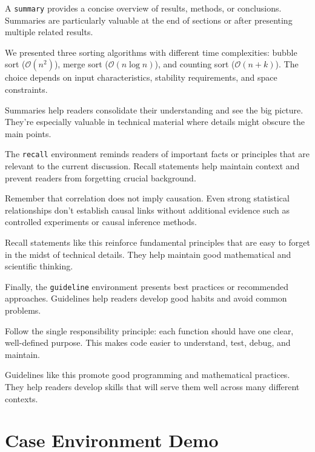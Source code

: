 \documentclass[9pt]{amsart}
\begin{document}
A \texttt{summary} provides a concise overview of results, methods, or
conclusions. Summaries are particularly valuable at the end of sections or
after presenting multiple related results.

\begin{summary}
	We presented three sorting algorithms with different time complexities: bubble sort ($\mathcal{O}(n^2)$), merge sort ($\mathcal{O}(n \log n)$), and counting sort ($\mathcal{O}(n + k)$). The choice depends on input characteristics, stability requirements, and space constraints.
\end{summary}

Summaries help readers consolidate their understanding and see the big picture.
They're especially valuable in technical material where details might obscure
the main points.

The \texttt{recall} environment reminds readers of important facts or
principles that are relevant to the current discussion. Recall statements help
maintain context and prevent readers from forgetting crucial background.

\begin{recall}
	Remember that correlation does not imply causation. Even strong statistical relationships don't establish causal links without additional evidence such as controlled experiments or causal inference methods.
\end{recall}

Recall statements like this reinforce fundamental principles that are easy to
forget in the midst of technical details. They help maintain good mathematical
and scientific thinking.

Finally, the \texttt{guideline} environment presents best practices or
recommended approaches. Guidelines help readers develop good habits and avoid
common problems.

\begin{guideline}
	Follow the single responsibility principle: each function should have one clear, well-defined purpose. This makes code easier to understand, test, debug, and maintain.
\end{guideline}

Guidelines like this promote good programming and mathematical practices. They
help readers develop skills that will serve them well across many different
contexts.

\section{Case Environment Demo}
\end{document}
